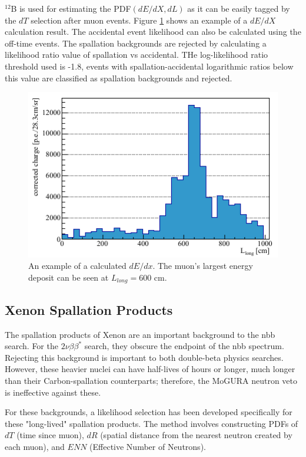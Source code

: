 $^{12}$B is used for estimating the PDF$(dE/dX,dL)$ as it can be easily tagged by the $dT$ selection after muon events. Figure \ref{fig:shower_pdf} shows an example of a $dE/dX$ calculation result. The accidental event likelihood can also be calculated using the off-time events. The spallation backgrounds are rejected by calculating a likelihood ratio value of spallation vs accidental. THe log-likelihood ratio threshold used is -1.8, events with spallation-accidental logarithmic ratios below this value are classified as spallation backgrounds and rejected.

\begin{figure}[htb]
	\centering
	\includegraphics[scale=0.75]{shower_dedx.png}
	\caption{An example of a calculated $dE/dx$. The muon's largest energy deposit can be seen at $L_{long}=600$ cm.}
	\label{fig:shower_pdf}
\end{figure}

\subsection{Xenon Spallation Products}
The spallation products of Xenon are an important background to the \0nbb search. For the $2\nu\beta\beta^*$ search, they obscure the endpoint of the \2nbb spectrum. Rejecting this background is important to both double-beta physics searches. However, these heavier nuclei can have half-lives of hours or longer, much longer than their Carbon-spallation counterparts; therefore, the MoGURA neutron veto is ineffective against these. 

For these backgrounds, a likelihood selection has been developed specifically for these "long-lived" spallation products. The method involves constructing PDFs of $dT$ (time since muon), $dR$ (spatial distance from the nearest neutron created by each muon), and $ENN$ (Effective Number of Neutrons).

